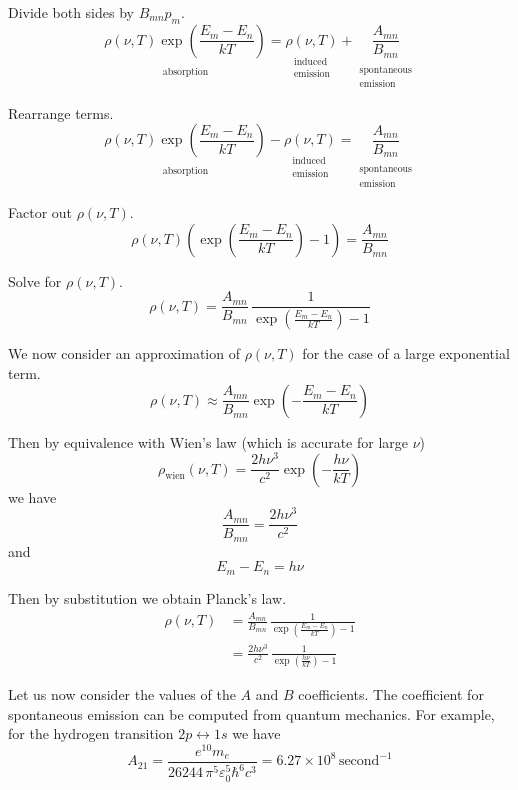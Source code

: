 \documentclass[12pt]{article}
\newcommand\BMN{B_{mn}} %
\newcommand\AMN{A_{mn}} %
\newcommand\RHO{\rho(\nu,T)}
\newcommand\ABSORPTION{\substack{\\[1ex] \text{absorption}}}
\newcommand\INDUCED{\substack{\\[1ex] \text{induced}\\ \text{emission}}}
\newcommand\SPONTANEOUS{\substack{\\[1ex] \text{spontaneous}\\ \text{emission}}}
\begin{document}
\noindent
Divide both sides by $\BMN p_m$.
\begin{equation*}
\underset{\ABSORPTION}{\RHO\exp\left(\frac{E_m-E_n}{kT}\right)}
=\underset{\INDUCED}{\RHO}+\underset{\SPONTANEOUS}{\frac{\AMN}{\BMN}}
\end{equation*}

\noindent
Rearrange terms.
\begin{equation*}
\underset{\ABSORPTION}{\RHO\exp\left(\frac{E_m-E_n}{kT}\right)}
-\underset{\INDUCED}{\RHO}=\underset{\SPONTANEOUS}{\frac{\AMN}{\BMN}}
\end{equation*}

\noindent
Factor out $\RHO$.
\begin{equation*}
\RHO\left(\exp\left(\frac{E_m-E_n}{kT}\right)-1\right)
=\frac{\AMN}{\BMN}
\end{equation*}

\noindent
Solve for $\RHO$.
\begin{equation*}
\RHO
=\frac{\AMN}{\BMN}\,\frac{1}{\exp\left(\frac{E_m-E_n}{kT}\right)-1}
\end{equation*}

\noindent
We now consider an approximation of $\RHO$ for the case of a large exponential term.
\begin{equation*}
\RHO\approx
\frac{\AMN}{\BMN}\exp\left(-\frac{E_m-E_n}{kT}\right)
\end{equation*}

\noindent
Then by equivalence with Wien's law (which is accurate for large $\nu$)
\begin{equation*}
\rho_\text{wien}(\nu,T)=\frac{2h\nu^3}{c^2}\exp\left(-\frac{h\nu}{kT}\right)
\end{equation*}
we have
\begin{equation*}
\frac{\AMN}{\BMN}=\frac{2h\nu^3}{c^2}
\tag{4}
\end{equation*}
and
\begin{equation*}
E_m-E_n=h\nu
\end{equation*}

\noindent
Then by substitution we obtain Planck's law.
\begin{align*}
\RHO
&=\frac{\AMN}{\BMN}\,\frac{1}{\exp\left(\frac{E_m-E_n}{kT}\right)-1}
\\[1.5ex]
&=\frac{2h\nu^3}{c^2}\,\frac{1}{\exp\left(\frac{h\nu}{kT}\right)-1}
\end{align*}

\noindent
Let us now consider the values of the $A$ and $B$ coefficients.
The coefficient for spontaneous emission can be computed from quantum mechanics.
For example, for the hydrogen transition $2p\leftrightarrow1s$ we have
\begin{equation*}
A_{21}=\frac{e^{10}m_e}{26244\,\pi^5\varepsilon_0^5\hbar^6 c^3}
=6.27\times10^8\,\text{second}^{-1}
\end{equation*}
\end{document}
